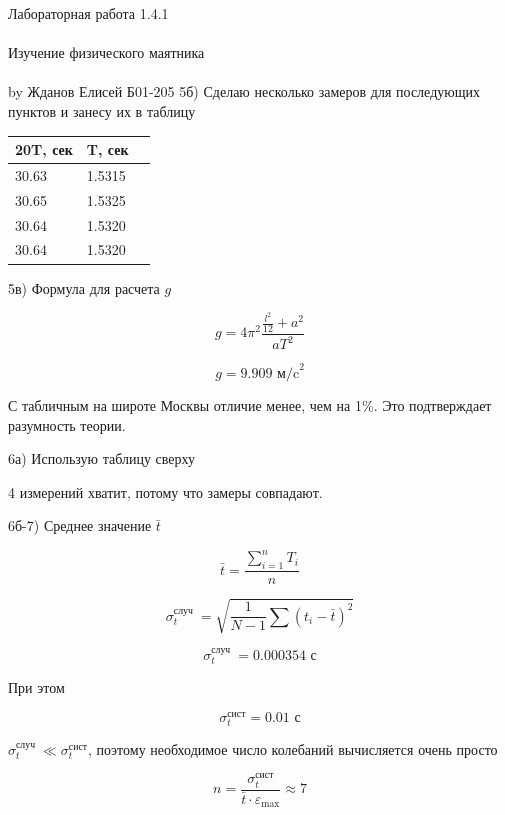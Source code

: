 \documentclass{astroedu-lab}
\begin{document}
\begin{problem}{\huge Лабораторная работа 1.4.1\\\\Изучение физического маятника\\\\by Жданов Елисей Б01-205}
5б) Сделаю несколько замеров для последующих пунктов и занесу их в таблицу

\begin{center}
\begin{tabular}[t]{|l|l|l|}
\hline
20T, сек & T, сек \\
\hline
30.63 & 1.5315 \\
30.65 & 1.5325 \\ 
30.64 & 1.5320 \\
30.64 & 1.5320 \\
\hline
\end{tabular}
\end{center}

5в) Формула для расчета $g$

\begin{equation}
	g = 4 \pi^2 \frac{\frac{l^{2}}{12}+a^{2}}{a T^2}
\end{equation}

\begin{equation}
	g = 9.909 \text{ м/c}^2
\end{equation}

С табличным на широте Москвы отличие менее, чем на 1$\%$. Это подтверждает разумность теории.

6а) Использую таблицу сверху

4 измерений хватит, потому что замеры совпадают.

6б-7) Среднее значение \(\bar{t}\)

\begin{equation}
	\bar{t} = \frac{\sum ^n _{i = 1} T_i}{n}
\end{equation}

\[
	\sigma_{t}^{\text {случ }} = \sqrt{\frac{1}{N-1} \sum				\left(t_{i}-\bar{t}\right)^{2}}
\]

\begin{equation}
	\sigma_{t}^{\text {случ }} = 0.000354 \text{ с}
\end{equation}

При этом

\begin{equation}
	\sigma_{t}^{\text {сист}} = 0.01 \text{ с}
\end{equation}

$\sigma_{t}^{\text {случ }} \ll \sigma_{t}^{\text {сист}}$, поэтому необходимое число колебаний вычисляется очень просто

\begin{equation}
	n = \frac{\sigma_{t}^{\text {сист}}}{\bar{t} \cdot \varepsilon_{\text{max}}} \approx 7
\end{equation}


\end{problem}
\end{document}
